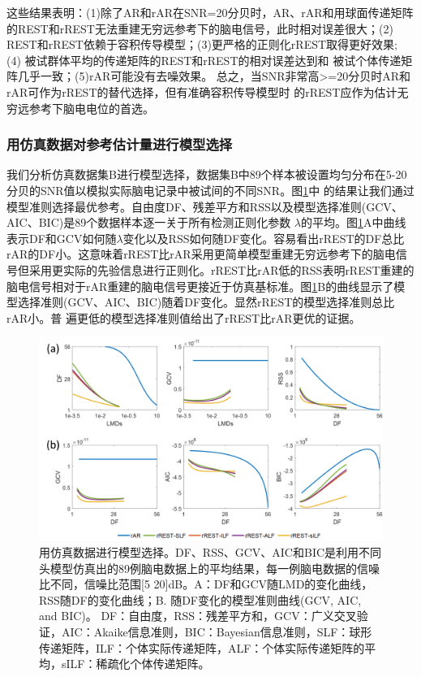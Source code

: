 这些结果表明：(1)除了AR和rAR在SNR=20分贝时，AR、rAR和用球面传递矩阵的REST和rREST无法重建无穷远参考下的脑电信号，此时相对误差很大；(2) REST和rREST依赖于容积传导模型；(3)更严格的正则化rREST取得更好效果; (4) 被试群体平均的传递矩阵的REST和rREST的相对误差达到和
被试个体传递矩阵几乎一致；(5)rAR可能没有去噪效果。 总之，当SNR非常高>=20分贝时AR和rAR可作为rREST的替代选择，但有准确容积传导模型时
的rREST应作为估计无穷远参考下脑电电位的首选。

\subsubsection{用仿真数据对参考估计量进行模型选择}
我们分析仿真数据集B进行模型选择，数据集B中89个样本被设置均匀分布在5-20分贝的SNR值以模拟实际脑电记录中被试间的不同SNR。图\ref{3.5}中
的结果让我们通过模型准则选择最优参考。自由度DF、残差平方和RSS以及模型选择准则(GCV、AIC、BIC)是89个数据样本逐一关于所有检测正则化参数
$\lambda$的平均。图\ref{3.5}A中曲线表示DF和GCV如何随$\lambda$变化以及RSS如何随DF变化。容易看出rREST的DF总比rAR的DF小。这意味着rREST比rAR采用更简单模型重建无穷远参考下的脑电信号但采用更实际的先验信息进行正则化。rREST比rAR低的RSS表明rREST重建的脑电信号相对于rAR重建的脑电信号更接近于仿真基标准。图\ref{3.5}B的曲线显示了模型选择准则(GCV、AIC、BIC)随着DF变化。显然rREST的模型选择准则总比rAR小。普
遍更低的模型选择准则值给出了rREST比rAR更优的证据。
\begin{figure}[!h]
	\centering
	\includegraphics[width=15cm]{pic/Frontier/figure5.png}
	\caption{用仿真数据进行模型选择。DF、RSS、GCV、AIC和BIC是利用不同头模型仿真出的89例脑电数据上的平均结果，每一例脑电数据的信噪比不同，信噪比范围[5 20]dB。A：DF和GCV随LMD的变化曲线，RSS随DF的变化曲线；B. 随DF变化的模型准则曲线(GCV, AIC, and BIC)。 DF：自由度，RSS：残差平方和，GCV：广义交叉验证，AIC：Akaike信息准则，BIC：Bayesian信息准则，SLF：球形传递矩阵，ILF：个体实际传递矩阵，ALF：个体实际传递矩阵的平均，sILF：稀疏化个体传递矩阵。}
	\label{3.5}
\end{figure}

